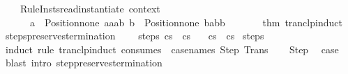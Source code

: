 \begin{isabellebody}
\ \ \ \ {\isacharparenleft}Rule{\isacharunderscore}Insts{\isachardot}read{\isacharunderscore}instantiate\ {\isacharat}{\isacharbraceleft}context{\isacharbraceright}\isanewline
\ \ \ \ \ \ {\isacharbrackleft}{\isacharparenleft}{\isacharparenleft}{\isacharparenleft}{\isachardoublequote}a{\isachardoublequote}{\isacharcomma}\ {}{\isacharparenright}{\isacharcomma}\ Position{\isachardot}none{\isacharparenright}{\isacharcomma}\ {\isachardoublequote}{\isacharparenleft}aa{\isacharcomma}ab{\isacharparenright}{\isachardoublequote}{\isacharparenright}{\isacharcomma}\ {\isacharparenleft}{\isacharparenleft}{\isacharparenleft}{\isachardoublequote}b{\isachardoublequote}{\isacharcomma}\ {}{\isacharparenright}{\isacharcomma}\ Position{\isachardot}none{\isacharparenright}{\isacharcomma}\ {\isachardoublequote}{\isacharparenleft}ba{\isacharcomma}bb{\isacharparenright}{\isachardoublequote}{\isacharparenright}{\isacharbrackright}\ {\isacharbrackleft}{\isacharbrackright}\isanewline
\ \ \ \ \ \ {\isacharat}{\isacharbraceleft}thm\ tranclp{\isacharunderscore}induct{\isacharbraceright}{\isacharparenright}{\isacharparenright}{\isacharsemicolon}\isanewline
{\isacartoucheclose}%
\endisatagML
{\isafoldML}%
%
\isadelimML
\isanewline
%
\endisadelimML
\isanewline
{}\isamarkupfalse%
\ steps{\isacharunderscore}preserves{\isacharunderscore}termination{\isacharprime}{\isacharcolon}\ \isanewline
\ \ \ steps{\isacharcolon}\ {\isachardoublequoteopen}{\isasymGamma}{\isasymturnstile}{\isacharparenleft}c{\isacharcomma}s{\isacharparenright}\ {\isasymrightarrow}\isactrlsup {\isacharplus}\ {\isacharparenleft}c{\isacharprime}{\isacharcomma}s{\isacharprime}{\isacharparenright}{\isachardoublequoteclose}\isanewline
\ \ \ {\isachardoublequoteopen}{\isasymGamma}{\isasymturnstile}c{\isasymdown}s\ {\isasymLongrightarrow}\ {\isasymGamma}{\isasymturnstile}c{\isacharprime}{\isasymdown}s{\isacharprime}{\isachardoublequoteclose}\isanewline
%
\isadelimproof
%
\endisadelimproof
%
\isatagproof
{}\isamarkupfalse%
\ steps\isanewline
{}\isamarkupfalse%
\ {\isacharparenleft}induct\ rule{\isacharcolon}\ tranclp{\isacharunderscore}induct{}\ {\isacharbrackleft}consumes\ {}{\isacharcomma}\ case{\isacharunderscore}names\ Step\ Trans{\isacharbrackright}{\isacharparenright}\isanewline
\ \ \isamarkupfalse%
\ Step\ \isamarkupfalse%
\ {\isacharquery}case\ \isamarkupfalse%
\ {\isacharparenleft}blast\ intro{\isacharcolon}\ step{\isacharunderscore}preserves{\isacharunderscore}termination{\isacharparenright}\isanewline

\end{isabellebody}
